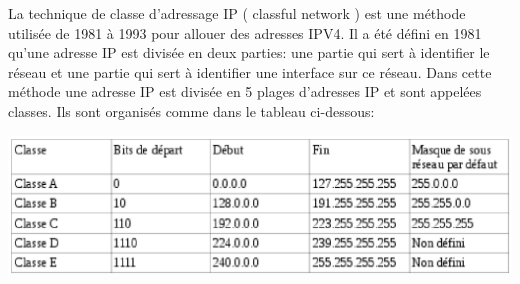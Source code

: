 \documentclass[twoside,openright,a4paper,11pt,french]{article}
\begin{document}
\pagestyle{plain}




\parskip=0pt
\tableofcontents

\newpage





La technique de classe d'adressage IP ( classful network ) est une méthode
utilisée de 1981 à 1993 pour allouer des adresses IPV4. Il a été défini en 1981
qu'une adresse IP est divisée en deux parties: une partie qui sert à
identifier le réseau et une partie qui sert à identifier une interface sur ce
réseau. Dans cette méthode une adresse IP est divisée en 5 plages d'adresses
IP et sont appelées classes. Ils sont organisés comme dans le tableau
ci-dessous:

\includegraphics{./pics/tableau.eps}
\end{document}
